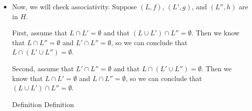 \begin{itemize}
\item Now, we will check associativity. Suppose $(L,f)$, $(L',g)$, and $(L'',h)$ are in $H$. 

  First, assume that $L \cap L' = \emptyset$ and that $(L \cup L') \cap L'' = \emptyset$. 
  Then we know that $L \cap L'' = \emptyset$ and $L' \cap L'' = \emptyset$, so we can 
  conclude that $L \cap (L' \cup L'') = \emptyset$. 

  Second, assume that $L' \cap L'' = \emptyset$ and that $L \cap (L' \cup L'') = \emptyset$. 
  Then we know that $L \cap L' = \emptyset$ and $L \cap L'' = \emptyset$, so we can 
  conclude that $(L \cup L') \cap L'' = \emptyset$. 

  \begin{eqnproof}
          {Definition}
           {Definition}

\end{eqnproof}
\end{itemize}
